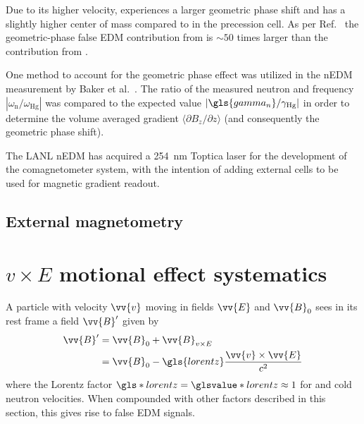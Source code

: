 Due to its higher velocity, \hg experiences a larger geometric phase shift and has a slightly higher center of mass compared to \ucn in the precession cell. As per Ref.~\cite{pendlebury_revised_2015} the geometric-phase false EDM contribution from \hg is $\sim 50$ times larger than the contribution from \ucn. 

One method to account for the geometric phase effect was utilized in the nEDM measurement by Baker et al.~\cite{BAK06}. The ratio of the measured neutron and \hg frequency $|\omega_\text{n}/\omega_\text{Hg}|$ was compared to the expected value $|\gls{gamma_n}/\gamma_\text{Hg}|$ in order to determine the volume averaged gradient $\langle \partial B_z/\partial z \rangle$ (and consequently the geometric phase shift).

The LANL nEDM has acquired a \qty{254}{\nano\meter} Toptica laser for the development of the comagnetometer system, with the intention of adding external \hg cells to be used for magnetic gradient readout.


\subsection{External magnetometry}\label{sec:external_magnetometry}




\section
{
    \texorpdfstring{$v\times E$ motional effect systematics}
                    {v x E motional effect systematics}\label{sec:v_cross_E}
}


A particle with velocity $\vv{v}$ moving in fields $\vv{E}$ and $\vv{B}_0$ sees in its rest frame a field $\vv{B}'$ given by
%
\begin{align}
    \vv{B}' &= \vv{B}_0+\vv{B}_{v\times E} \\
            &= \vv{B}_0-\gls{lorentz}\frac{\vv{v}\times\vv{E}}{c^2}
\end{align}
%
where the Lorentz factor $\gls*{lorentz}=\glsvalue*{lorentz}\approx 1$ for \ucn and cold neutron velocities. When compounded with other factors described in this section, this gives rise to false EDM signals.

